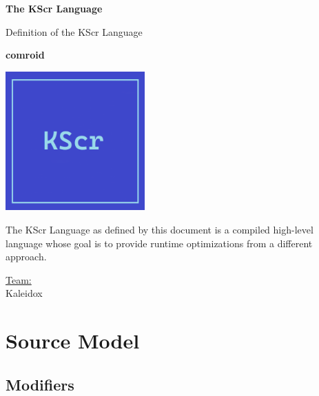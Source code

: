 \documentclass{docs}
\begin{document}
    \begin{titlepage}
        \begin{center}
            \vspace*{1cm}
            
            \Huge
            \textbf{The KScr Language}
            
            \vspace{0.5cm}
            \LARGE
            Definition of the KScr Language
            
            \vspace{1.5cm}
            
            \textbf{comroid}
            
            \vspace{0.8cm}
            
            \includegraphics[width=0.4\textwidth]{../img/kscr-icon.png}
            
            \vfill
            
            The KScr Language as defined by this document is a compiled high-level language whose goal is to provide runtime optimizations from a different approach.
            
            \vspace{1.2cm}
            
            \Large
            \underline{Team:} \\
            Kaleidox
        \end{center}
    \end{titlepage}
    \tableofcontents
    \pagebreak
    \section{Source Model}
    \subsection{Modifiers}
\end{document}
